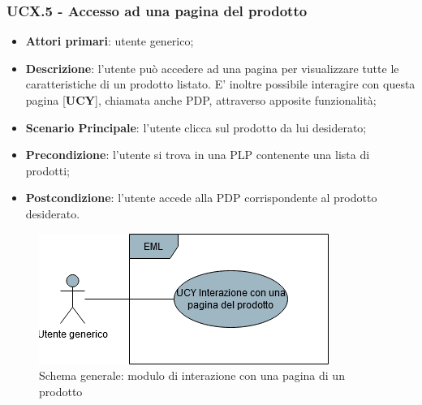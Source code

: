 \subsubsection{UCX.5 - Accesso ad una pagina del prodotto}
\begin{itemize}
\item \textbf{Attori primari}: utente generico;
\item \textbf{Descrizione}: l'utente può accedere ad una pagina per visualizzare tutte le caratteristiche di un prodotto listato. E' inoltre possibile interagire con questa pagina [\textbf{UCY}], chiamata anche PDP, attraverso apposite funzionalità;
\item \textbf{Scenario Principale}: l'utente clicca sul prodotto da lui desiderato;
\item \textbf{Precondizione}: l'utente si trova in una PLP contenente una lista di prodotti;
\item \textbf{Postcondizione}: l'utente accede alla PDP corrispondente al prodotto desiderato.
\end{itemize}
\begin{figure}[H]
\centering
\includegraphics[scale=0.6]{res/UseCase/Immagini/InterazionePaginaProdottoGenerale}
\caption{Schema generale: modulo di interazione con una pagina di un prodotto}
\end{figure}